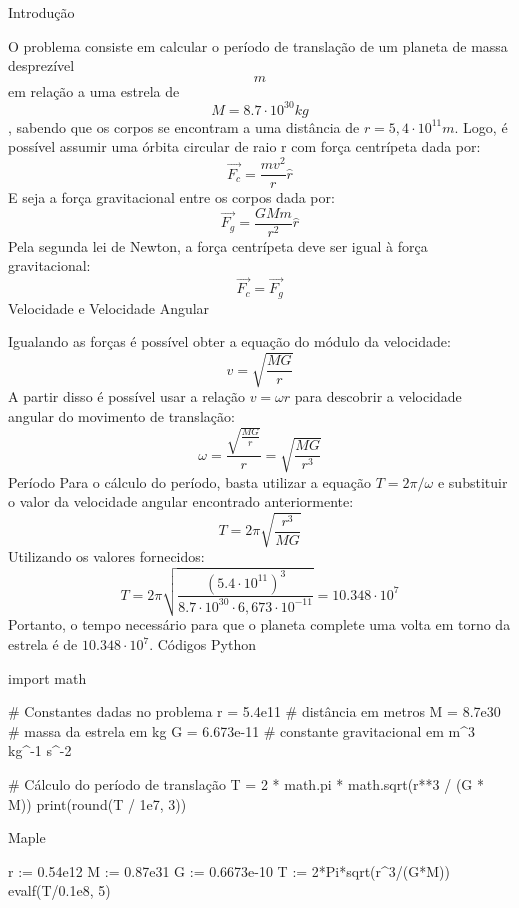 Introdução

O problema consiste em calcular o período de translação de um planeta de massa desprezível $$m$$ em relação a uma estrela de $$M = 8.7 \cdot 10^{30}kg$$, sabendo que os corpos se encontram a uma distância de $r = 5,4 \cdot 10^{11}m$. Logo, é possível assumir uma órbita circular de raio r com força centrípeta dada por: \begin{equation} \vec{F_c} = \frac{mv^{2}}{r} \hat{r} \end{equation} E seja a força gravitacional entre os corpos dada por: \begin{equation} \vec{F_g} = \frac{GMm}{r^{2}} \hat{r} \end{equation} Pela segunda lei de Newton, a força centrípeta deve ser igual à força gravitacional: \begin{equation} \vec{F_c} = \vec{F_g} \end{equation}
Velocidade e Velocidade Angular

Igualando as forças é possível obter a equação do módulo da velocidade: \begin{equation} v = \sqrt{\frac{MG}{r}} \end{equation} A partir disso é possível usar a relação $v = \omega r$ para descobrir a velocidade angular do movimento de translação: \begin{equation} \omega = \frac{\sqrt{\frac{MG}{r}}}{r} = \sqrt{\frac{MG}{r^{3}}} \end{equation}
Período
Para o cálculo do período, basta utilizar a equação $T = 2 \pi / \omega$ e substituir o valor da velocidade angular encontrado anteriormente: \begin{equation} T = 2 \pi \sqrt{\frac{r^{3}}{MG}} \end{equation} Utilizando os valores fornecidos: \begin{equation} T = 2 \pi \sqrt{\frac{(5.4 \cdot 10^{11})^{3}}{8.7 \cdot 10^{30} \cdot 6,673 \cdot 10^{-11}}} = 10.348 \cdot 10^{7} \end{equation} Portanto, o tempo necessário para que o planeta complete uma volta em torno da estrela é de $10.348 \cdot 10^{7}$.
Códigos
Python

import math

# Constantes dadas no problema
r = 5.4e11 # distância em metros
M = 8.7e30 # massa da estrela em kg
G = 6.673e-11 # constante gravitacional em m^3 kg^-1 s^-2

# Cálculo do período de translação
T = 2 * math.pi * math.sqrt(r**3 / (G * M))
print(round(T / 1e7, 3))

Maple

r := 0.54e12
M := 0.87e31
G := 0.6673e-10
T := 2*Pi*sqrt(r^3/(G*M))
evalf(T/0.1e8, 5) 